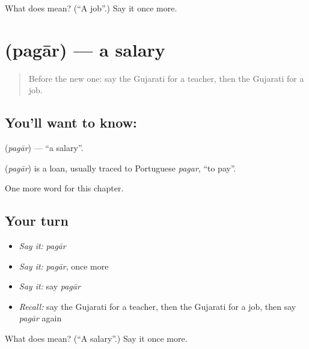 \begin{tcolorbox}[breakable,colback=teal!4,colframe=teal!35!black,title={Before you move on}]
What does  mean? (\textquotedblleft{}A job\textquotedblright{}.) Say it once more.
\end{tcolorbox}
\section[\texorpdfstring{\gu{પગાર} (pagār)}{પગાર (pagār)}]{ (pagār) — a salary}

\label{lesson:GU-C130-pagar}



\begin{quote}
Before the new one: say the Gujarati for a teacher, then the Gujarati for a job.
\end{quote}

\subsection*{You'll want to know: }
\textbf{} (\emph{pagār}) — \textquotedblleft{}a salary\textquotedblright{}.

\begin{cousinweb}
\textbf{} (\emph{pagār}) is a loan, usually traced to Portuguese \emph{pagar}, \textquotedblleft{}to pay\textquotedblright{}.
\end{cousinweb}

\begin{grammarlens}[title={What you've built}]
One more word for this chapter.
\end{grammarlens}

\subsection*{Your turn}
\begin{itemize}
\raggedright
  \item \emph{Say it:} \emph{pagār}
  \item \emph{Say it:} \emph{pagār}, once more
  \item \emph{Say it:} say \emph{pagār}
  \item \emph{Recall:} say the Gujarati for a teacher, then the Gujarati for a job, then say \emph{pagār} again
\end{itemize}

\begin{tcolorbox}[breakable,colback=teal!4,colframe=teal!35!black,title={Before you move on}]
What does  mean? (\textquotedblleft{}A salary\textquotedblright{}.) Say it once more.
\end{tcolorbox}
